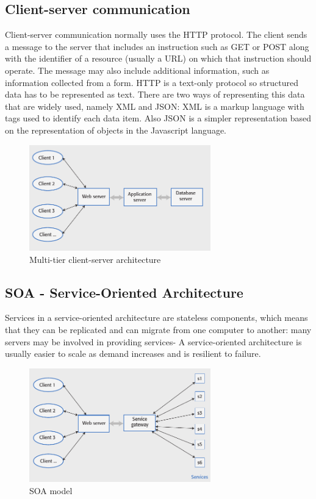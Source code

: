 \documentclass[10pt,a4paper]{report}
\begin{document}
\subsection{Client-server communication}
Client-server communication normally uses the HTTP protocol. The client sends a message to the server that includes an instruction such as GET or POST along with the identifier of a resource (usually a URL) on which
that instruction should operate. The message may also include additional information, such as information collected from a form.
HTTP is a text-only protocol so structured data has to be represented as
text. There are two ways of representing this data that are widely used, namely XML and JSON: XML is a markup language with tags used to identify each data item. Also JSON is a simpler representation based on the representation of objects in the Javascript language.

 \begin{figure}[h]
	\centering
	\includegraphics[width=0.7\textwidth]{image31}
	\caption{Multi-tier client-server architecture}
	\label{image31}
\end{figure}

\subsection{SOA - Service-Oriented Architecture}
Services in a service-oriented architecture are stateless components, which means that they can be replicated and can migrate from one computer to another: many servers may be involved in providing services- A service-oriented architecture is usually easier to scale as demand increases and is resilient to failure.
 \begin{figure}[h]
	\centering
	\includegraphics[width=0.7\textwidth]{image32}
	\caption{SOA model}
	\label{image32}
\end{figure}
\end{document}
